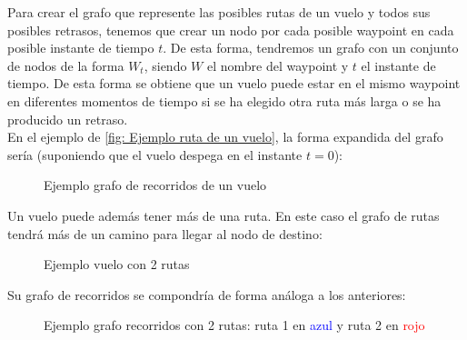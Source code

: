 Para crear el grafo que represente las posibles rutas de un vuelo y todos sus posibles retrasos, tenemos que crear un nodo por cada posible waypoint en cada posible instante de tiempo $t$. De esta forma, tendremos un grafo con un conjunto de nodos de la forma $W_{t}$, siendo $W$ el nombre del waypoint y $t$ el instante de tiempo. De esta forma se obtiene que un vuelo puede estar en el mismo waypoint en diferentes momentos de tiempo si se ha elegido otra ruta más larga o se ha producido un retraso.\\

En el ejemplo de \autoref{fig: Ejemplo ruta de un vuelo}, la forma expandida del grafo sería (suponiendo que el vuelo despega en el instante $t=0$): 
\begin{figure}[H]
	\centering
	
	\caption{Ejemplo grafo de recorridos de un vuelo}
	\label{fig: Ejemplo grafo de recorridos de un vuelo}
\end{figure}

Un vuelo puede además tener más de una ruta. En este caso el grafo de rutas tendrá más de un camino para llegar al nodo de destino:
\begin{figure}[H]
	\centering
	
	\caption{Ejemplo vuelo con 2 rutas}
	\label{fig: Ejemplo vuelo con 2 rutas}
\end{figure}

Su grafo de recorridos se compondría de forma análoga a los anteriores:
\begin{figure}[H]
	\centering
	
	\caption{Ejemplo grafo recorridos con 2 rutas: ruta 1 en \textcolor{blue}{azul} y ruta 2 en \textcolor{red}{rojo}  }
	\label{fig: Ejemplo grafo recorridos con 2 rutas}
\end{figure}
